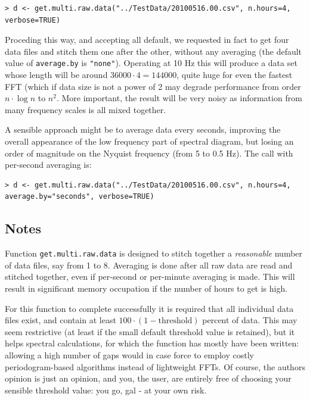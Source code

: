 \documentclass[a4paper,10pt]{book}
\begin{document}
\begin{verbatim}
> d <- get.multi.raw.data("../TestData/20100516.00.csv", n.hours=4, verbose=TRUE)
\end{verbatim} 

Proceding this way, and accepting all default, we requested in fact to get four data files and stitch them one after the other, without any averaging (the default value of \verb|average.by| is \verb|"none"|). Operating at 10 Hz this will produce a data set whose length will be around $36000 \cdot 4 = 144000$, quite huge for even the fastest FFT (which if data size is not a power of 2 may degrade performance from order $n \cdot \log n$ to $n^{2}$. More important, the result will be very noisy as information from many frequency scales is all mixed together.

A sensible approach might be to average data every seconds, improving the overall appearance of the low frequency part of spectral diagram, but losing an order of magnitude on the Nyquist frequency (from 5 to 0.5 Hz). The call with per-second averaging is:

\begin{verbatim}
> d <- get.multi.raw.data("../TestData/20100516.00.csv", n.hours=4, average.by="seconds", verbose=TRUE)
\end{verbatim} 

\subsection{Notes}

Function \verb|get.multi.raw.data| is designed to stitch together a \emph{reasonable} number of data files, say from 1 to 8. Averaging is done after all raw data are read and stitched together, even if per-second or per-minute averaging is made. This will result in significant memory occupation if the number of hours to get is high.

For this function to complete successfully it is required that all individual data files exist, and contain at least $100 \cdot (1-\mbox{threshold})$ percent of data. This may seem restrictive (at least if the small default threshold value is retained), but it helps spectral calculations, for which the function has mostly have been written: allowing a high number of gaps would in case force to employ costly periodogram-based algorithms instead of lightweight FFTs. Of course, the authors opinion is just an opinion, and you, the user, are entirely free of choosing your sensible threshold value: you go, gal - at your own risk.
\end{document}
